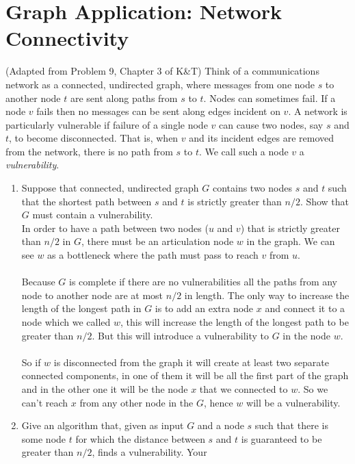 \documentclass[11pt]{article}
\def\ans#1{{\color{ans}#1}}
\begin{document}
\section{Graph Application: Network Connectivity}
\label{sec-4}
(Adapted from Problem 9, Chapter 3 of K\&T) Think of a communications
network  as a connected, undirected graph, where messages from one node $s$ to another node
$t$ are sent along paths from $s$ to $t$.  Nodes can sometimes fail.
If a node $v$ fails then no messages can be sent along edges incident
on $v$. A network is particularly vulnerable if failure of a
single node $v$ can cause two nodes, say $s$ and $t$, to become
disconnected. That is, when $v$ and its incident edges are removed
from the network, there is no path from $s$ to $t$.
We call such a node $v$ a \emph{vulnerability}.

\begin{enumerate}
\item Suppose that connected, undirected graph $G$ contains two nodes $s$ and $t$ such
that the shortest path between $s$ and $t$ is strictly greater than
$n/2$. Show that $G$ must contain a vulnerability. \\
\ans{
  In order to have a path between two nodes ($u$ and $v$) that is strictly greater than $n/2$ in $G$, 
  there must be an articulation node $w$ in the graph. We can see $w$ as a bottleneck where the 
  path must pass to reach $v$ from $u$. \\ \\
  Because $G$ is complete if there are no vulnerabilities all the paths from any node to 
  another node are at most $n/2$ in length. The only way to increase the length of the longest path 
  in $G$ is to add an extra node $x$ and connect it to a node which we called $w$, 
  this will increase the length of the longest path to be greater than $n/2$. 
  But this will introduce a vulnerability to $G$ in the node $w$.\\ \\
  So if $w$ is disconnected from the graph it will create at least two separate connected 
  components, in one of them it will be all the first part of the graph and in the other one it will 
  be the node $x$ that we connected to $w$. So we can't reach $x$ from any other node in the 
  $G$, hence $w$ will be a vulnerability.
}
\clearpage
\item Give an algorithm that, given as input $G$ and a node $s$ such that
there is some node $t$ for which the distance between $s$ and $t$
is guaranteed to be greater than $n/2$, finds a vulnerability. Your

\end{enumerate}
\end{document}
